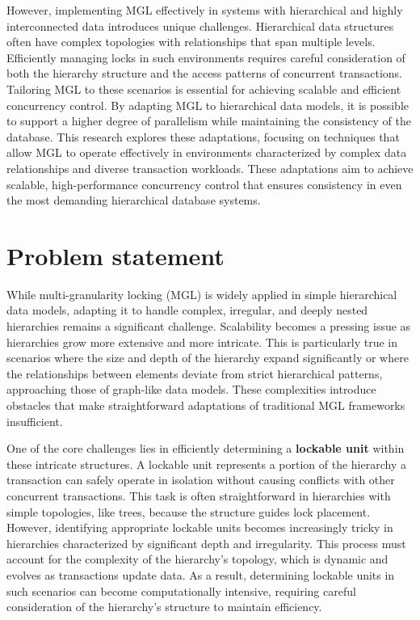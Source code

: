 However, implementing MGL effectively in systems with hierarchical and highly interconnected data introduces unique challenges. Hierarchical data structures often have complex topologies with relationships that span multiple levels. Efficiently managing locks in such environments requires careful consideration of both the hierarchy structure and the access patterns of concurrent transactions. Tailoring MGL to these scenarios is essential for achieving scalable and efficient concurrency control. By adapting MGL to hierarchical data models, it is possible to support a higher degree of parallelism while maintaining the consistency of the database. This research explores these adaptations, focusing on techniques that allow MGL to operate effectively in environments characterized by complex data relationships and diverse transaction workloads. These adaptations aim to achieve scalable, high-performance concurrency control that ensures consistency in even the most demanding hierarchical database systems.

\section*{Problem statement}

While multi-granularity locking (MGL) is widely applied in simple hierarchical data models, adapting it to handle complex, irregular, and deeply nested hierarchies remains a significant challenge. Scalability becomes a pressing issue as hierarchies grow more extensive and more intricate. This is particularly true in scenarios where the size and depth of the hierarchy expand significantly or where the relationships between elements deviate from strict hierarchical patterns, approaching those of graph-like data models. These complexities introduce obstacles that make straightforward adaptations of traditional MGL frameworks insufficient.

One of the core challenges lies in efficiently determining a \textbf{lockable unit} within these intricate structures. A lockable unit represents a portion of the hierarchy a transaction can safely operate in isolation without causing conflicts with other concurrent transactions. This task is often straightforward in hierarchies with simple topologies, like trees, because the structure guides lock placement. However, identifying appropriate lockable units becomes increasingly tricky in hierarchies characterized by significant depth and irregularity. This process must account for the complexity of the hierarchy's topology, which is dynamic and evolves as transactions update data. As a result, determining lockable units in such scenarios can become computationally intensive, requiring careful consideration of the hierarchy's structure to maintain efficiency.

